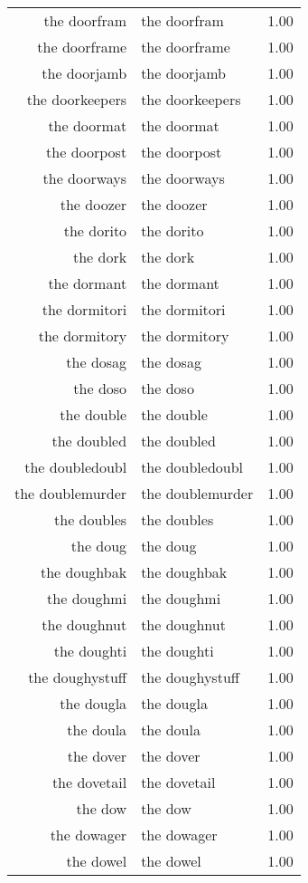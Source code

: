 \begin{table}[ht]
\begin{tabular}{rlr}
  the doorfram & the doorfram & 1.00 \\ 
  the doorframe & the doorframe & 1.00 \\ 
  the doorjamb & the doorjamb & 1.00 \\ 
  the doorkeepers & the doorkeepers & 1.00 \\ 
  the doormat & the doormat & 1.00 \\ 
  the doorpost & the doorpost & 1.00 \\ 
  the doorways & the doorways & 1.00 \\ 
  the doozer & the doozer & 1.00 \\ 
  the dorito & the dorito & 1.00 \\ 
  the dork & the dork & 1.00 \\ 
  the dormant & the dormant & 1.00 \\ 
  the dormitori & the dormitori & 1.00 \\ 
  the dormitory & the dormitory & 1.00 \\ 
  the dosag & the dosag & 1.00 \\ 
  the doso & the doso & 1.00 \\ 
  the double & the double & 1.00 \\ 
  the doubled & the doubled & 1.00 \\ 
  the doubledoubl & the doubledoubl & 1.00 \\ 
  the doublemurder & the doublemurder & 1.00 \\ 
  the doubles & the doubles & 1.00 \\ 
  the doug & the doug & 1.00 \\ 
  the doughbak & the doughbak & 1.00 \\ 
  the doughmi & the doughmi & 1.00 \\ 
  the doughnut & the doughnut & 1.00 \\ 
  the doughti & the doughti & 1.00 \\ 
  the doughystuff & the doughystuff & 1.00 \\ 
  the dougla & the dougla & 1.00 \\ 
  the doula & the doula & 1.00 \\ 
  the dover & the dover & 1.00 \\ 
  the dovetail & the dovetail & 1.00 \\ 
  the dow & the dow & 1.00 \\ 
  the dowager & the dowager & 1.00 \\ 
  the dowel & the dowel & 1.00 \\ 

\end{tabular}
\end{table}
